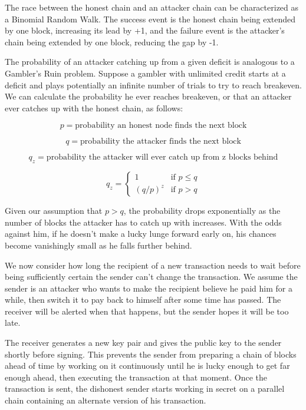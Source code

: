 \documentclass{article}
\begin{document}
{The race between the honest chain and an attacker chain can be characterized as a Binomial Random Walk. The success event is the honest chain being extended by one block, increasing its lead by +1, and the failure event is the attacker's chain being extended by one block, reducing the gap by -1.

The probability of an attacker catching up from a given deficit is analogous to a Gambler's Ruin problem. Suppose a gambler with unlimited credit starts at a deficit and plays potentially an infinite number of trials to try to reach breakeven. We can calculate the probability he ever reaches breakeven, or that an attacker ever catches up with the honest chain, as follows:

\begin{equation}
p = \text{probability an honest node finds the next block}
\end{equation}

\begin{equation}
q = \text{probability the attacker finds the next block}
\end{equation}

\begin{equation}
q_z = \text{probability the attacker will ever catch up from z blocks behind}
\end{equation}

\begin{equation}
q_z = \begin{cases}
1 & \text{if } p \leq q \\
(q/p)^z & \text{if } p > q
\end{cases}

\end{equation}

Given our assumption that $p > q$, the probability drops exponentially as the number of blocks the attacker has to catch up with increases. With the odds against him, if he doesn't make a lucky lunge forward early on, his chances become vanishingly small as he falls further behind.

We now consider how long the recipient of a new transaction needs to wait before being sufficiently certain the sender can't change the transaction. We assume the sender is an attacker who wants to make the recipient believe he paid him for a while, then switch it to pay back to himself after some time has passed. The receiver will be alerted when that happens, but the sender hopes it will be too late.

The receiver generates a new key pair and gives the public key to the sender shortly before signing. This prevents the sender from preparing a chain of blocks ahead of time by working on it continuously until he is lucky enough to get far enough ahead, then executing the transaction at that moment. Once the transaction is sent, the dishonest sender starts working in secret on a parallel chain containing an alternate version of his transaction.

}
\end{document}

